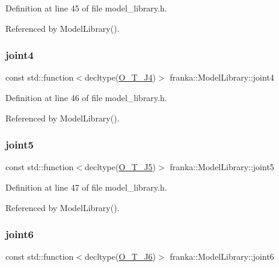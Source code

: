 Definition at line 45 of file model\+\_\+library.\+h.



Referenced by Model\+Library().

\mbox{\label{classfranka_1_1ModelLibrary_a18423f2eeee2cea52a270fcec47ba981}} 
\subsubsection{\texorpdfstring{joint4}{joint4}}
{\footnotesize\ttfamily const std\+::function$<$decltype(\hyperlink{libfcimodels_8h_a2d90f09392f9d34a83ab9812edadd7a6}{O\+\_\+\+T\+\_\+\+J4})$>$ franka\+::\+Model\+Library\+::joint4}



Definition at line 46 of file model\+\_\+library.\+h.



Referenced by Model\+Library().

\mbox{\label{classfranka_1_1ModelLibrary_ac622a201cd72ab734fddc052fb42bb97}} 
\subsubsection{\texorpdfstring{joint5}{joint5}}
{\footnotesize\ttfamily const std\+::function$<$decltype(\hyperlink{libfcimodels_8h_a299a5e5c9ec0eb604e2f37ceeb9a1ed6}{O\+\_\+\+T\+\_\+\+J5})$>$ franka\+::\+Model\+Library\+::joint5}



Definition at line 47 of file model\+\_\+library.\+h.



Referenced by Model\+Library().

\mbox{\label{classfranka_1_1ModelLibrary_ac940683ad7922d4efc0e82f4c1188ab2}} 
\subsubsection{\texorpdfstring{joint6}{joint6}}
{\footnotesize\ttfamily const std\+::function$<$decltype(\hyperlink{libfcimodels_8h_a6b60358c31837d93f81758afad043863}{O\+\_\+\+T\+\_\+\+J6})$>$ franka\+::\+Model\+Library\+::joint6}



